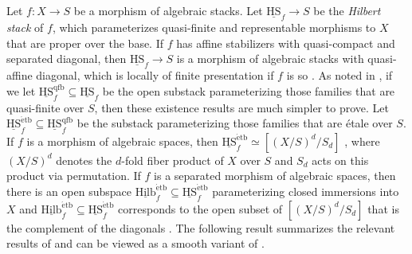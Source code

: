 \documentclass[10pt]{amsart}
\theoremstyle{plain}
\theoremstyle{definition}
\begin{document}
Let $f \colon X \to S$ be a morphism of algebraic stacks. Let
$\underline{\mathrm{HS}}_f \to S$ be the \emph{Hilbert stack} of $f$,
which parameterizes quasi-finite and representable morphisms to $X$
that are proper over the base. If $f$ has affine stabilizers with
quasi-compact and separated diagonal, then
$\underline{\mathrm{HS}}_f \to S$ is a morphism of algebraic stacks
with quasi-affine diagonal, which is locally of finite presentation if
$f$ is so \cite{MR3148551,MR3359029}. As noted in
\cite[Thm.~5.1]{MR3754421}, if we let
$\underline{\mathrm{HS}}_f^{\mathrm{qfb}} \subseteq \underline{\mathrm{HS}}_f$
be the open substack parameterizing those families that are
quasi-finite over $S$, then these existence results are much simpler
to prove. Let
$\underline{\mathrm{HS}}_f^{\mathrm{\acute{e}tb}} \subseteq
\underline{\mathrm{HS}}_f^{\mathrm{qfb}}$ be the substack parameterizing those
families that are \'etale over $S$. If $f$ is a morphism of algebraic spaces, then
$\underline{\mathrm{HS}}_f^{\mathrm{\acute{e}tb}} \simeq [(X/S)^d/S_d]$
\cite[Thm.~5.1]{MR2821738}, where $(X/S)^d$ denotes the $d$-fold fiber
product of $X$ over $S$ and $S_d$ acts on this product via
permutation. If $f$ is a separated morphism of algebraic spaces, then there is an
open subspace
$\underline{\mathrm{Hilb}}_f^{\mathrm{\acute{e}tb}} \subseteq
\underline{\mathrm{HS}}_f^{\mathrm{\acute{e}tb}}$ parameterizing closed immersions
into $X$ and
$\underline{\mathrm{Hilb}}_f^{\mathrm{\acute{e}tb}} \subseteq
\underline{\mathrm{HS}}_f^{\mathrm{\acute{e}tb}}$ corresponds to the open subset of
$[(X/S)^d/S_d]$ that is the complement of the diagonals
\cite[Thm.~5.1]{MR2821738}. The following result summarizes the
relevant results of \cite{MR2821738} and can be viewed as a smooth
variant of \cite[\S\S 5-6]{MR3754421}.
\end{document}
